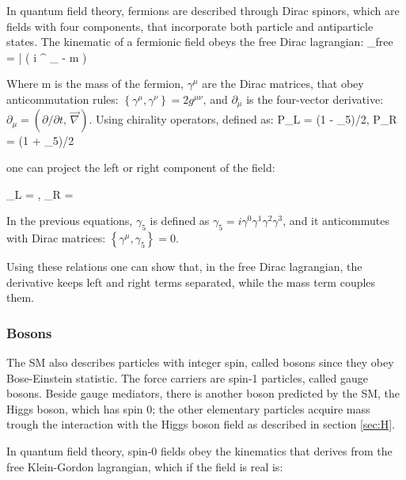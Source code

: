 In quantum field theory, fermions are described through Dirac spinors, which are fields with four components, that incorporate both particle and antiparticle states. The kinematic of a fermionic field obeys the free Dirac lagrangian:
\beq
 _{free} = \bar{\psi} \left( i \gamma^{\mu} \partial_{\mu} - m \right) \psi
 \label{eq:ldirac}
\eeq

Where m is the mass of the fermion, $\gamma^{\mu}$ are the Dirac matrices, that obey anticommutation rules: $\left\lbrace \gamma^{\mu}, \gamma^{\nu}  \right\rbrace = 2 g^{\mu \nu} $, and $\partial_{\mu} $ is the four-vector derivative: $\partial_\mu = ({\partial / \partial t},\, \vec{\nabla})$. Using chirality operators, defined as:
\beq
P_L = (1 - \gamma_5)/2, \qquad\qquad
P_R = (1 + \gamma_5)/2
\eeq

one can project the left or right component of the field:

\beq
\psi_L =  \psi, \qquad\qquad
\psi_R =  \psi
\eeq

In the previous equations, $\gamma_5$ is defined as $\gamma_5 = i \gamma^0 \gamma^1 \gamma^2 \gamma^3 $, and it anticommutes with Dirac matrices:  $\left\lbrace \gamma^{\mu}, \gamma_{5}  \right\rbrace = 0$.

Using these relations one can show that, in the free Dirac lagrangian, the derivative keeps left and right terms separated, while the mass term couples them.




\subsubsection{Bosons}

The SM also describes particles with integer spin, called bosons since they obey Bose-Einstein statistic. The force carriers are spin-1 particles, called gauge bosons. Beside gauge mediators, there is another boson predicted by the SM, the Higgs boson, which has spin 0; the other elementary particles acquire mass trough the interaction with the Higgs boson field as described in section \ref{sec:H}.

In quantum field theory, spin-0 fields obey the kinematics that derives from the free Klein-Gordon lagrangian, which if the field is real is:

